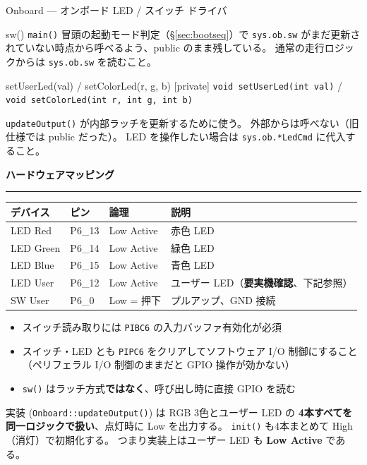 \documentclass[a4paper,11pt,dvipdfmx]{jsarticle}
\makeatletter
\newcommand{\apisection}[1]{%
  \par\addvspace{4mm}%
  {\normalsize\bfseries\color{headerblue} #1}%
  \par\vspace{-1mm}%
  {\color{accentblue!40}\rule{\linewidth}{0.5pt}}%
  \par\nobreak\vspace{2mm}%
  \@afterheading
}
\makeatother
\begin{document}
\begin{apibox}{Onboard --- オンボード LED / スイッチ ドライバ}
\begin{funcblock}{sw()}
\vspace{1.5mm}
\texttt{main()} 冒頭の起動モード判定（\hyperref[sec:bootseq]{§\ref*{sec:bootseq}}）で
\texttt{sys.ob.sw} がまだ更新されていない時点から呼べるよう、public のまま残している。
通常の走行ロジックからは \texttt{sys.ob.sw} を読むこと。
\end{funcblock}

\begin{funcblock}{setUserLed(val) / setColorLed(r, g, b) \normalfont\small\color{gray}[private]}
\texttt{void setUserLed(int val)} / \texttt{void setColorLed(int r, int g, int b)}

\vspace{1.5mm}
\texttt{updateOutput()} が内部ラッチを更新するために使う。
外部からは呼べない（旧仕様では public だった）。
LED を操作したい場合は \texttt{sys.ob.*LedCmd} に代入すること。
\end{funcblock}

\apisection{ハードウェアマッピング}

\begin{tabularx}{\textwidth}{l l l X}
\toprule
\textbf{デバイス} & \textbf{ピン} & \textbf{論理} & \textbf{説明} \\
\midrule
LED Red    & P6\_13 & Low Active & 赤色 LED \\
LED Green  & P6\_14 & Low Active & 緑色 LED \\
LED Blue   & P6\_15 & Low Active & 青色 LED \\
LED User   & P6\_12 & Low Active & ユーザー LED（\textbf{要実機確認}、下記参照） \\
SW User    & P6\_0  & Low = 押下 & プルアップ、GND 接続 \\
\bottomrule
\end{tabularx}

\begin{cautionbox}
\begin{itemize}[nosep]
  \item スイッチ読み取りには \texttt{PIBC6} の入力バッファ有効化が必須
  \item スイッチ・LED とも \texttt{PIPC6} をクリアしてソフトウェア I/O 制御にすること
        （ペリフェラル I/O 制御のままだと GPIO 操作が効かない）
  \item \texttt{sw()} はラッチ方式\textbf{ではなく}、呼び出し時に直接 GPIO を読む
\end{itemize}
\end{cautionbox}

\begin{cautionbox}
実装 (\texttt{Onboard::updateOutput()}) は RGB 3色とユーザー LED の
\textbf{4本すべてを同一ロジックで扱い}、点灯時に Low を出力する。
\texttt{init()} も4本まとめて High（消灯）で初期化する。
つまり実装上はユーザー LED も \textbf{Low Active} である。


\end{cautionbox}
\end{apibox}
\end{document}
